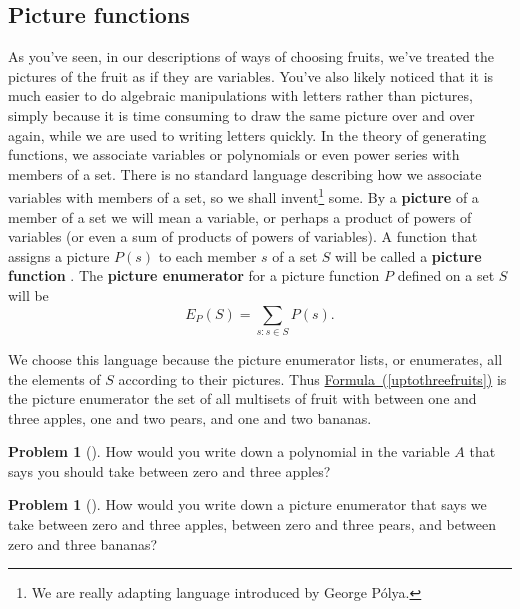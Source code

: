 \documentclass[10pt,]{book}
\newcommand{\terminology}[1]{\textbf{#1}}
\theoremstyle{plain}
\theoremstyle{definition}
\newtheorem{activity}[project]{Problem}
\theoremstyle{definition}
\numberwithin{equation}{chapter}
\begin{document}
\subsection[{Picture functions}]{Picture functions}\label{picturefunction}
As you've seen, in our descriptions of ways of choosing fruits, we've treated the pictures of the fruit as if they are variables. You've also likely noticed that it is much easier to do algebraic manipulations with letters rather than pictures, simply because it is time consuming to draw the same picture over and over again, while we are used to writing letters quickly. In the theory of generating functions, we associate variables or polynomials or even power series with members of a set. There is no standard language describing how we associate variables with members of a set, so we shall invent\footnote{We are really adapting language introduced by George Pólya.\label{fn-10}} some. By a \terminology{picture} of a member of a set we will mean a variable, or perhaps a product of powers of variables (or even a sum of products of powers of variables). A function that assigns a picture \(P(s)\) to each member \(s\) of a set \(S\) will be called a \terminology{picture function} . The \terminology{picture enumerator} for a picture function \(P\) defined on a set \(S\) will be%
\begin{equation*}
E_P(S) = \sum_{s: s\in S}  P(s).
\end{equation*}
%
\par
We choose this language because the picture enumerator lists, or enumerates, all the elements of \(S\) according to their pictures. Thus \hyperref[uptothreefruits]{Formula~(\ref{uptothreefruits})} is the picture enumerator the set of all multisets of fruit with between one and three apples, one and two pears, and one and two bananas.%
\begin{activity}[] \label{zerotothreeapples}
How would you write down a polynomial in the variable \(A\) that says you should take between zero and three apples?%
\end{activity}
\begin{activity}[] \label{zerotothreefruits}
How would you write down a picture enumerator that says we take between zero and three apples, between zero and three pears, and between zero and three bananas?%
\end{activity}
\end{document}
